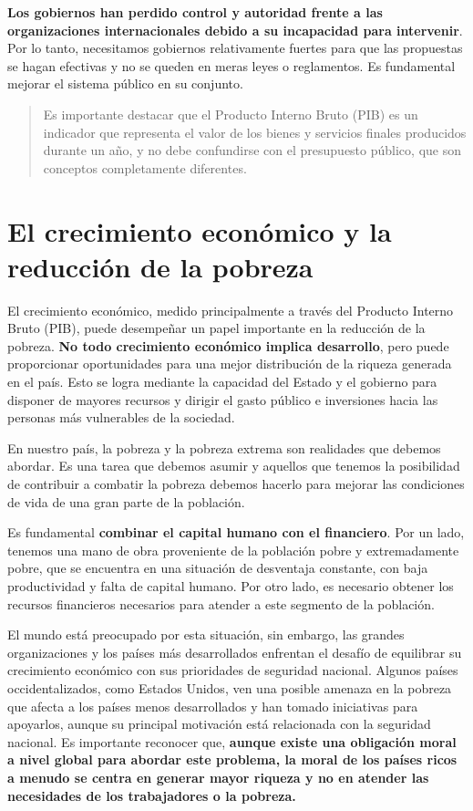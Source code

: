 \documentclass[
  jou,
  floatsintext,
  longtable,
  a4paper,
  nolmodern,
  notxfonts,
  notimes,
  12pt,
  colorlinks=true,linkcolor=blue,citecolor=blue,urlcolor=blue]{apa7}
\begin{document}
\textbf{Los gobiernos han perdido control y autoridad frente a las
organizaciones internacionales debido a su incapacidad para intervenir}.
Por lo tanto, necesitamos gobiernos relativamente fuertes para que las
propuestas se hagan efectivas y no se queden en meras leyes o
reglamentos. Es fundamental mejorar el sistema público en su conjunto.

\begin{quote}
Es importante destacar que el Producto Interno Bruto (PIB) es un
indicador que representa el valor de los bienes y servicios finales
producidos durante un año, y no debe confundirse con el presupuesto
público, que son conceptos completamente diferentes.
\end{quote}

\section{El crecimiento económico y la reducción de la
pobreza}\label{el-crecimiento-econuxf3mico-y-la-reducciuxf3n-de-la-pobreza}

El crecimiento económico, medido principalmente a través del Producto
Interno Bruto (PIB), puede desempeñar un papel importante en la
reducción de la pobreza. \textbf{No todo crecimiento económico implica
desarrollo}, pero puede proporcionar oportunidades para una mejor
distribución de la riqueza generada en el país. Esto se logra mediante
la capacidad del Estado y el gobierno para disponer de mayores recursos
y dirigir el gasto público e inversiones hacia las personas más
vulnerables de la sociedad.

En nuestro país, la pobreza y la pobreza extrema son realidades que
debemos abordar. Es una tarea que debemos asumir y aquellos que tenemos
la posibilidad de contribuir a combatir la pobreza debemos hacerlo para
mejorar las condiciones de vida de una gran parte de la población.

Es fundamental \textbf{combinar el capital humano con el financiero}.
Por un lado, tenemos una mano de obra proveniente de la población pobre
y extremadamente pobre, que se encuentra en una situación de desventaja
constante, con baja productividad y falta de capital humano. Por otro
lado, es necesario obtener los recursos financieros necesarios para
atender a este segmento de la población.

El mundo está preocupado por esta situación, sin embargo, las grandes
organizaciones y los países más desarrollados enfrentan el desafío de
equilibrar su crecimiento económico con sus prioridades de seguridad
nacional. Algunos países occidentalizados, como Estados Unidos, ven una
posible amenaza en la pobreza que afecta a los países menos
desarrollados y han tomado iniciativas para apoyarlos, aunque su
principal motivación está relacionada con la seguridad nacional. Es
importante reconocer que, \textbf{aunque existe una obligación moral a
nivel global para abordar este problema, la moral de los países ricos a
menudo se centra en generar mayor riqueza y no en atender las
necesidades de los trabajadores o la pobreza.}
\end{document}
